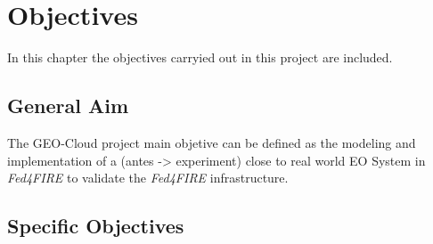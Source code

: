 \chapter{Objectives}
\label{chap:objetivos}
In this chapter the objectives carryied out in this project are included.

\section{General Aim}

The GEO-Cloud project main objetive can be defined as the modeling and
implementation of a (antes -> experiment) close to real world \ac{EO} System in \emph{Fed4FIRE} to validate the \emph{Fed4FIRE} infrastructure.

\section{Specific Objectives}

